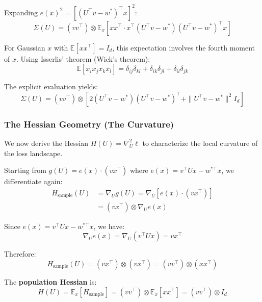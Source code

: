 \documentclass[
  journal=largetwo,
  year=2025,
  volume=37,
]{cup-journal}
\begin{document}
Expanding $e(x)^2 = [(U^\top v - w^*)^\top x]^2$:
\begin{equation}\label{eq:sigma_explicit}
    \Sigma(U) = (v v^\top) \otimes \mathbb{E}_x \left[ x x^\top \cdot x^\top (U^\top v - w^*)(U^\top v - w^*)^\top x \right]
\end{equation}

For Gaussian $x$ with $\mathbb{E}[x x^\top] = I_d$, this expectation involves the fourth moment of $x$. Using Isserlis' theorem (Wick's theorem):
\begin{equation}
    \mathbb{E}[x_i x_j x_k x_l] = \delta_{ij}\delta_{kl} + \delta_{ik}\delta_{jl} + \delta_{il}\delta_{jk}
\end{equation}

The explicit evaluation yields:
\begin{equation}
    \Sigma(U) = (v v^\top) \otimes \left[ 2(U^\top v - w^*)(U^\top v - w^*)^\top + \|U^\top v - w^*\|^2 I_d \right]
\end{equation}



\subsubsection{The Hessian Geometry (The Curvature)}

We now derive the Hessian $H(U) = \nabla^2_U \ell$ to characterize the local curvature of the loss landscape.

Starting from $g(U) = e(x) \cdot (v x^\top)$ where $e(x) = v^\top U x - w^{*\top} x$, we differentiate again:
\begin{align}
    H_{\text{sample}}(U) &= \nabla_U g(U) = \nabla_U \left[ e(x) \cdot (v x^\top) \right] \nonumber \\
    &= (v x^\top) \otimes \nabla_U e(x)
\end{align}

Since $e(x) = v^\top U x - w^{*\top} x$, we have:
\begin{equation}
    \nabla_U e(x) = \nabla_U (v^\top U x) = v x^\top
\end{equation}

Therefore:
\begin{equation}
    H_{\text{sample}}(U) = (v x^\top) \otimes (v x^\top) = (v v^\top) \otimes (x x^\top)
\end{equation}

The \textbf{population Hessian} is:
\begin{equation}\label{eq:hessian_explicit}
    \boxed{H(U) = \mathbb{E}_x[H_{\text{sample}}] = (v v^\top) \otimes \mathbb{E}_x[x x^\top] = (v v^\top) \otimes I_d}
\end{equation}
\end{document}
